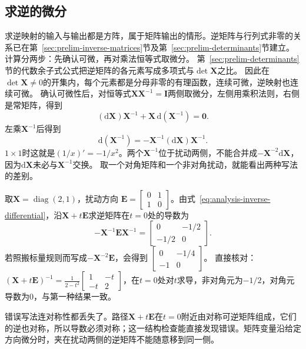 \subsection{求逆的微分}
求逆映射的输入与输出都是方阵，属于矩阵输出的情形。逆矩阵与行列式非零的关系已在第~\ref{sec:prelim-inverse-matrices}节及第~\ref{sec:prelim-determinants}节建立。
计算分两步：先确认可微，再对乘法恒等式取微分。
第~\ref{sec:prelim-determinants}节的代数余子式公式把逆矩阵的各元素写成多项式与$\det\bm X$之比。
因此在$\det\bm X\neq0$的开集内，每个元素都是分母非零的有理函数，连续可微，逆映射也连续可微。
确认可微性后，对恒等式$\bm{X}\bm{X}^{-1}=\bm{I}$两侧取微分，左侧用乘积法则，右侧是常矩阵，得到
\[
 (\mathrm{d}\bm{X})\bm{X}^{-1}+\bm{X}\,\mathrm{d}(\bm{X}^{-1})=\bm{0}.
\]
左乘$\bm{X}^{-1}$后得到
\begin{equation}
  \mathrm{d}(\bm{X}^{-1})
  =
  -\bm{X}^{-1}(\mathrm{d}\bm{X})\bm{X}^{-1}.
\label{eq:analysis-inverse-differential}
\end{equation}
$1\times1$时这就是$(1/x)'=-1/x^2$。两个$\bm{X}^{-1}$位于扰动两侧，不能合并成$-\bm{X}^{-2}\mathrm{d}\bm{X}$，因为$\mathrm{d}\bm{X}$未必与$\bm{X}^{-1}$交换。
取一个对角矩阵和一个非对角扰动，就能看出两种写法的差别。
\begin{example}[逆矩阵微分中的乘法次序]
\label{ex:analysis-noncommuting-inverse-differential}
取$\bm X=\operatorname{diag}(2,1)$，扰动方向
$\bm E=\begin{bmatrix}0&1\\1&0\end{bmatrix}$。由式~\eqref{eq:analysis-inverse-differential}，沿$\bm X+t\bm E$求逆矩阵在$t=0$处的导数为
\[
 -\bm X^{-1}\bm E\bm X^{-1}
 =\begin{bmatrix}0&-1/2\\-1/2&0\end{bmatrix}.
\]
若照搬标量规则而写成$-\bm X^{-2}\bm E$，会得到
$\begin{bmatrix}0&-1/4\\-1&0\end{bmatrix}$。
直接核对：$(\bm X+t\bm E)^{-1}=\frac1{2-t^2}\begin{bmatrix}1&-t\\-t&2\end{bmatrix}$，在$t=0$处对$t$求导，非对角元为$-1/2$，对角元导数为$0$，与第一种结果一致。
\end{example}

错误写法连对称性都丢失了。路径$\bm X+t\bm E$在$t=0$附近由对称可逆矩阵组成，它们的逆也对称，所以导数必须对称；这一结构检查能直接发现错误。矩阵变量沿给定方向微分时，夹在扰动两侧的逆矩阵不能随意移到同一侧。

